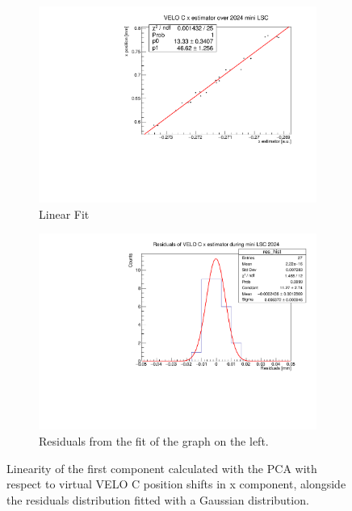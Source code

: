 \begin{figure}
    \centering
    \begin{subfigure}{0.48\textwidth}
    \includegraphics[width=\linewidth]{figures/x_fit_VELO_C_data.pdf}
    \caption{Linear Fit}\label{fig:x_veloC_fit_data}
    \end{subfigure}
    \begin{subfigure}{0.48\textwidth}
    \includegraphics[width=\linewidth]{figures/x_res_VELO_C_data.pdf}
    \caption{Residuals from the fit of the graph on the left. }\label{fig:x_veloC_res_data}
    \end{subfigure}
    \caption{Linearity of the first component calculated with the PCA with respect to  virtual VELO C position shifts in x component, alongside the residuals distribution fitted with a Gaussian distribution.}
    \label{fig:x_veloC_data}
\end{figure}
